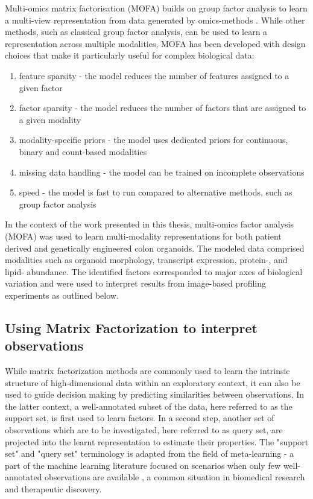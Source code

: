 \begin{flushleft}
Multi-omics matrix factorisation (MOFA) builds on group factor analysis to learn a multi-view representation from data generated by omics-methods \parencite{argelaguetMultiOmicsFactorAnalysis2018b, argelaguetMOFAStatisticalFramework2020a}. While other methods, such as classical group factor analysis, can be used to learn a representation across multiple modalities, MOFA has been developed with design choices that make it particularly useful for complex biological data:

\begin{enumerate}
    \item feature sparsity - the model reduces the number of features assigned to a given factor
    \item factor sparsity - the model reduces the number of factors that are assigned to a given modality
    \item modality-specific priors - the model uses dedicated priors for continuous, binary and count-based modalities 
    \item missing data handling - the model can be trained on incomplete observations
    \item speed - the model is fast to run compared to alternative methods, such as group factor analysis
\end{enumerate}
 
\bigbreak
In the context of the work presented in this thesis, multi-omics factor analysis (MOFA) was used to learn multi-modality representations for both patient derived and genetically engineered colon organoids. The modeled data comprised modalities such as organoid morphology, transcript expression, protein-, and lipid- abundance. The identified factors corresponded to major axes of biological variation and were used to interpret results from image-based profiling experiments as outlined below. 

\subsection{Using Matrix Factorization to interpret observations}

While matrix factorization methods are commonly used to learn the intrinsic structure of high-dimensional data within an exploratory context, it can also be used to guide decision making by predicting similarities between observations. In the latter context, a well-annotated subset of the data, here referred to as the support set, is first used to learn factors. In a second step, another set of observations which are to be investigated, here referred to as query set, are projected into the learnt representation to estimate their properties. The "support set" and "query set" terminology is adapted from the field of meta-learning - a part of the machine learning literature focused on scenarios when only few well-annotated observations are available \parencite{hospedalesMetaLearningNeuralNetworks2020}, a common situation in biomedical research and therapeutic discovery. 
\par


\end{flushleft}
